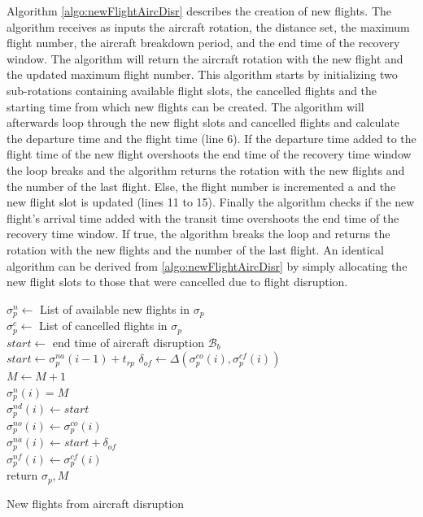 	
	
	Algorithm \ref{algo:newFlightAircDisr} describes the creation of new flights. The algorithm receives as inputs the aircraft rotation, the distance set, the maximum flight number, the aircraft breakdown period, and the end time of the recovery window. The algorithm will return the aircraft rotation with the new flight and the updated maximum flight number. This algorithm starts by initializing two sub-rotations containing available flight slots, the cancelled flights and the starting time from which new flights can be created. The algorithm will afterwards loop through the new flight slots and cancelled flights and calculate the departure time and the flight time (line 6). If the departure time added to the flight time of the new flight overshoots the end time of the recovery time window the loop breaks and the algorithm returns the rotation with the new flights and the number of the last flight. Else, the flight number is incremented a and the new flight slot is updated (lines 11 to 15). Finally the algorithm checks if the new flight's arrival time added with the transit time overshoots the end time of the recovery time window. If true, the algorithm breaks the loop  and returns the rotation with the new flights and the number of the last flight. An identical algorithm can be derived from \ref{algo:newFlightAircDisr} by simply allocating the new flight slots to those that were cancelled due to flight disruption.\\
	
	\begin{algorithm}[H]
		\DontPrintSemicolon
		
		$\sigma^n_p \gets$ List of available new flights in $\sigma_p$ \\
		$\sigma^c_p \gets$ List of cancelled flights in $\sigma_p$ \\
		$start \gets$ end time of aircraft disruption $\mathcal{B}_b$\\
		{
			 { $start \gets \sigma^{na}_p(i-1)  + t_{rp}$}
			$\delta_{of} \gets \Delta(\sigma^{co}_p(i), \sigma^{cf}_p(i))$\\
			$M \gets M + 1$\\
			$\sigma^n_p(i) = M$\\
			$\sigma^{nd}_p(i) \gets start$ \\
			$\sigma^{no}_p(i) \gets \sigma^{co}_p(i)$\\
			$\sigma^{na}_p(i) \gets start + \delta_{of}$\\
			$\sigma^{nf}_p(i) \gets \sigma^{cf}_p(i)$\\
		}
		return $\sigma_p, M$
		\caption{New flights from aircraft disruption}
		\label{algo:newFlightAircDisr}
	\end{algorithm}


